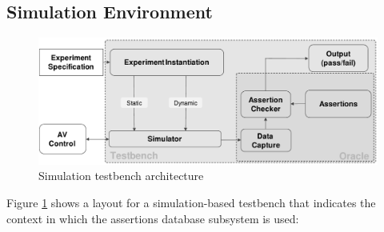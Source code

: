 \subsection{Simulation Environment} \label{generic_sim_system}

\begin{figure}[!ht]
    \centering
    \includegraphics[width=0.98\linewidth]{../other/figures/SimulatorAssertionsTestBenchArchitectureV7.pdf}
    \caption{Simulation testbench architecture}
    \label{fig:SimulatorArchitecture}
\end{figure}

  Figure \ref{fig:SimulatorArchitecture} shows a layout for a simulation-based testbench that indicates the context in which the assertions database subsystem is used:

